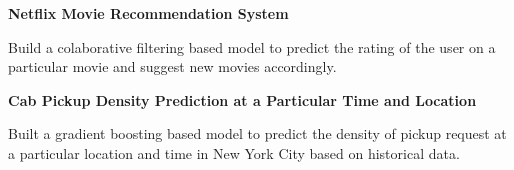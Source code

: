 \documentclass[letterpaper,MMMyyyy,nonstopmode]{simpleresumecv}
\begin{document}
\begin{Body}
                \Entry
                    \textbf{Netflix Movie Recommendation System}

                    \Gap

                    \Item
                        Build a colaborative filtering based model to predict the 
                        rating of the user on a particular movie and suggest new movies accordingly.
                

                \BigGap

            
                \Entry
                    \textbf{Cab Pickup Density Prediction at a Particular Time and Location}

                    \Gap

                    \Item
                        Built a gradient boosting based model to predict the density 
                        of pickup request at a particular location and time in 
                        New York City based on historical data.
                
                
                \BigGap
                                    
        \end{Body}
    
    
\end{document}
